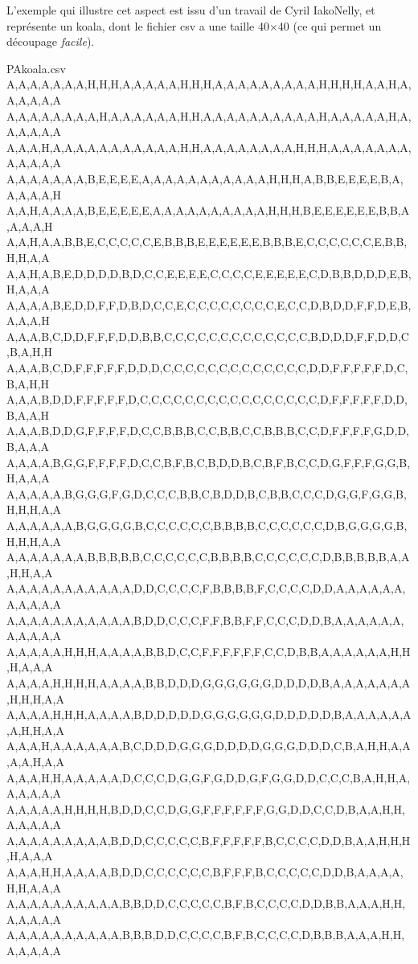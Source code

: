 \documentclass{article}
\begin{document}
\smallskip

L'exemple qui illustre cet aspect est issu d'un travail de Cyril IakoNelly, et représente un koala, dont le fichier \textsf{csv} a une taille 40×40 (ce qui permet un découpage \textit{facile}).

\begin{filecontents*}[overwrite]{PAkoala.csv}
A,A,A,A,A,A,A,H,H,H,A,A,A,A,A,H,H,H,A,A,A,A,A,A,A,A,A,H,H,H,H,A,A,H,A,A,A,A,A,A
A,A,A,A,A,A,A,A,H,A,A,A,A,A,A,H,H,A,A,A,A,A,A,A,A,A,A,H,A,A,A,A,A,H,A,A,A,A,A,A
A,A,A,H,A,A,A,A,A,A,A,A,A,A,A,H,H,A,A,A,A,A,A,A,A,H,H,H,A,A,A,A,A,A,A,A,A,A,A,A
A,A,A,A,A,A,A,B,E,E,E,E,A,A,A,A,A,A,A,A,A,A,A,H,H,H,A,B,B,E,E,E,E,B,A,A,A,A,A,H
A,A,H,A,A,A,A,B,E,E,E,E,E,A,A,A,A,A,A,A,A,A,A,H,H,H,B,E,E,E,E,E,E,B,B,A,A,A,A,H
A,A,H,A,A,B,B,E,C,C,C,C,C,E,B,B,B,E,E,E,E,E,E,B,B,B,E,C,C,C,C,C,C,E,B,B,H,H,A,A
A,A,H,A,B,E,D,D,D,D,B,D,C,C,E,E,E,E,C,C,C,C,E,E,E,E,E,C,D,B,B,D,D,D,E,B,H,A,A,A
A,A,A,A,B,E,D,D,F,F,D,B,D,C,C,E,C,C,C,C,C,C,C,C,E,C,C,D,B,D,D,F,F,D,E,B,A,A,A,H
A,A,A,B,C,D,D,F,F,F,D,D,B,B,C,C,C,C,C,C,C,C,C,C,C,C,C,B,D,D,D,F,F,D,D,C,B,A,H,H
A,A,A,B,C,D,F,F,F,F,F,D,D,D,C,C,C,C,C,C,C,C,C,C,C,C,C,D,D,F,F,F,F,F,D,C,B,A,H,H
A,A,A,B,D,D,F,F,F,F,F,D,C,C,C,C,C,C,C,C,C,C,C,C,C,C,C,C,D,F,F,F,F,F,D,D,B,A,A,H
A,A,A,B,D,D,G,F,F,F,F,D,C,C,B,B,B,C,C,B,B,C,C,B,B,B,C,C,D,F,F,F,F,G,D,D,B,A,A,A
A,A,A,A,B,G,G,F,F,F,F,D,C,C,B,F,B,C,B,D,D,B,C,B,F,B,C,C,D,G,F,F,F,G,G,B,H,A,A,A
A,A,A,A,A,B,G,G,G,F,G,D,C,C,C,B,B,C,B,D,D,B,C,B,B,C,C,C,D,G,G,F,G,G,B,H,H,H,A,A
A,A,A,A,A,A,B,G,G,G,G,B,C,C,C,C,C,C,B,B,B,B,C,C,C,C,C,C,D,B,G,G,G,G,B,H,H,H,A,A
A,A,A,A,A,A,A,B,B,B,B,B,C,C,C,C,C,C,B,B,B,B,C,C,C,C,C,C,D,B,B,B,B,B,A,A,H,H,A,A
A,A,A,A,A,A,A,A,A,A,A,D,D,C,C,C,C,F,B,B,B,B,F,C,C,C,C,D,D,A,A,A,A,A,A,A,A,A,A,A
A,A,A,A,A,A,A,A,A,A,A,B,D,D,C,C,C,F,F,B,B,F,F,C,C,C,D,D,B,A,A,A,A,A,A,A,A,A,A,A
A,A,A,A,A,H,H,H,A,A,A,A,B,B,D,C,C,F,F,F,F,F,F,C,C,D,B,B,A,A,A,A,A,A,H,H,H,A,A,A
A,A,A,A,H,H,H,H,A,A,A,A,B,B,D,D,D,G,G,G,G,G,G,D,D,D,D,B,A,A,A,A,A,A,A,H,H,H,A,A
A,A,A,A,H,H,H,A,A,A,A,B,D,D,D,D,D,G,G,G,G,G,G,D,D,D,D,D,B,A,A,A,A,A,A,A,H,H,A,A
A,A,A,H,A,A,A,A,A,A,B,C,D,D,D,G,G,G,D,D,D,D,G,G,G,D,D,D,C,B,A,H,H,A,A,A,A,H,A,A
A,A,A,H,H,A,A,A,A,A,D,C,C,C,D,G,G,F,G,D,D,G,F,G,G,D,D,C,C,C,B,A,H,H,A,A,A,A,A,A
A,A,A,A,A,H,H,H,H,B,D,D,C,C,D,G,G,F,F,F,F,F,F,G,G,D,D,C,C,D,B,A,A,H,H,A,A,A,A,A
A,A,A,A,A,A,A,A,A,B,D,D,C,C,C,C,C,B,F,F,F,F,F,B,C,C,C,C,D,D,B,A,A,H,H,H,H,A,A,A
A,A,A,H,H,A,A,A,A,B,D,D,C,C,C,C,C,C,B,F,F,F,B,C,C,C,C,C,D,D,B,A,A,A,A,H,H,A,A,A
A,A,A,A,A,A,A,A,A,A,B,B,D,D,C,C,C,C,C,B,F,B,C,C,C,C,D,D,B,B,A,A,A,H,H,A,A,A,A,A
A,A,A,A,A,A,A,A,A,A,B,B,B,D,D,C,C,C,C,B,F,B,C,C,C,C,D,B,B,B,A,A,A,H,H,A,A,A,A,A

\end{filecontents*}
\end{document}
